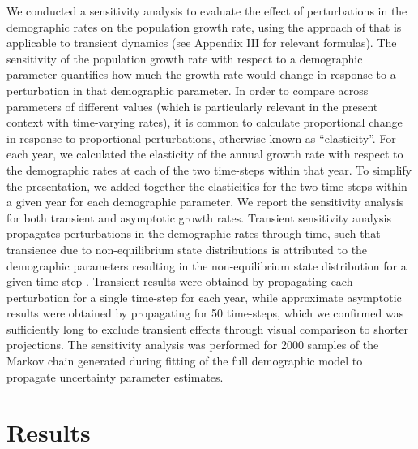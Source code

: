 \documentclass[11pt]{article}
\begin{document}
We conducted a sensitivity analysis
to evaluate the effect of perturbations
in the demographic rates on the population growth rate,
using the approach of \cite{caswell2007sensitivity}
that is applicable to transient dynamics
(see Appendix III for relevant formulas).
The sensitivity of the population growth rate with respect to a demographic parameter
quantifies how much the growth rate would change in response to a perturbation in that
demographic parameter.
In order to compare across parameters of different values
(which is particularly relevant in the present context with time-varying rates),
it is common to calculate proportional change in
response to proportional perturbations,
otherwise known as ``elasticity''.
For each year, we calculated the elasticity of the annual growth rate with respect
to the demographic rates at each of the two time-steps within that year.
To simplify the presentation,
we added together the  elasticities for the two time-steps within a given year
for each demographic parameter.
We report the sensitivity analysis for both transient and asymptotic growth rates.
Transient sensitivity analysis propagates perturbations in the demographic rates
through time,
such that transience due to non-equilibrium state distributions is attributed to the
demographic parameters resulting in the non-equilibrium state distribution
for a given time step \citep{caswell2007sensitivity}.
Transient results were obtained by propagating each perturbation for
a single time-step for each year,
while approximate asymptotic results were obtained by propagating for 50 time-steps,
which we confirmed was sufficiently long to exclude transient effects
through visual comparison to shorter projections.
The sensitivity analysis was performed for 2000 samples of the Markov chain generated
during fitting of the full demographic model to propagate uncertainty parameter estimates.






\section*{Results}
\end{document}
